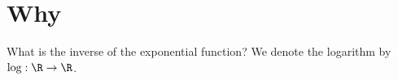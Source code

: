 
\section*{Why}

What is the inverse of the exponential function?
We denote the logarithm by $\log : \R  \to \R $.
